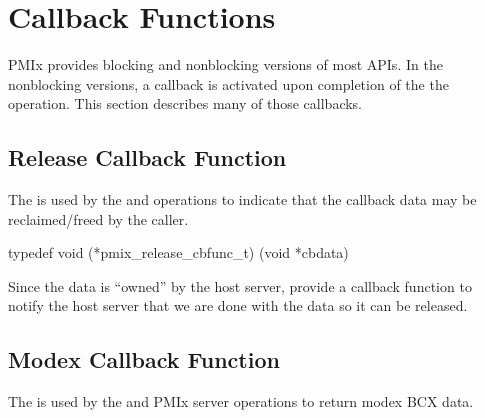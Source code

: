 %

%

\section{Callback Functions}

PMIx provides blocking and nonblocking versions of most APIs.
In the nonblocking versions, a callback is activated upon completion of the the operation.
This section describes many of those callbacks.


\subsection{Release Callback Function}

\summary

The  is used by the  and  operations to indicate that the callback data may be reclaimed/freed by the caller.

\format

\cspecificstart
\begin{codepar}
typedef void (*pmix_release_cbfunc_t)
    (void *cbdata)
\end{codepar}
\cspecificend

\begin{arglist}
\end{arglist}

\descr

Since the data is ``owned'' by the host server, provide a callback function to notify the host server that we are done with the data so it can be released.


\subsection{Modex Callback Function}

\summary

The  is used by the  and  PMIx server operations to return modex \ac{BCX} data.

